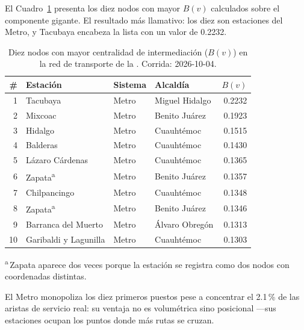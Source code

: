 El Cuadro~\ref{tab:bv-top10} presenta los diez nodos con mayor $B(v)$ calculados
sobre el componente gigante. El resultado más llamativo: los diez son estaciones
del Metro, y Tacubaya encabeza la lista con un valor de 0.2232.

\begin{table}[H]
    \centering
    \caption[Top 10 nodos por centralidad de intermediación $B(v)$]{%
    Diez nodos con mayor centralidad de intermediación ($B(v)$) en la
    red de transporte de la \zmvm{}. Corrida: 2026-10-04.}
    \label{tab:bv-top10}
    \small
    \begin{tabular}{|r|l|l|l|r|}
        \hline
        \textbf{\#} & \textbf{Estación} & \textbf{Sistema} &
        \textbf{Alcaldía} & \textbf{$B(v)$} \\
        \hline
         1 & Tacubaya                  & Metro & Miguel Hidalgo & 0.2232 \\
         2 & Mixcoac                   & Metro & Benito Juárez  & 0.1923 \\
         3 & Hidalgo                   & Metro & Cuauhtémoc     & 0.1515 \\
         4 & Balderas                  & Metro & Cuauhtémoc     & 0.1430 \\
         5 & Lázaro Cárdenas           & Metro & Cuauhtémoc     & 0.1365 \\
         6 & Zapata\textsuperscript{a} & Metro & Benito Juárez  & 0.1357 \\
         7 & Chilpancingo              & Metro & Cuauhtémoc     & 0.1348 \\
         8 & Zapata\textsuperscript{a} & Metro & Benito Juárez  & 0.1346 \\
         9 & Barranca del Muerto       & Metro & Álvaro Obregón & 0.1313 \\
        10 & Garibaldi y Lagunilla     & Metro & Cuauhtémoc     & 0.1303 \\
        \hline
    \end{tabular}
    \vspace{0.4em}

    \noindent\textsuperscript{a}\,Zapata aparece dos veces porque la
    estación se registra como dos nodos con coordenadas distintas.

\end{table}

El Metro monopoliza los diez primeros puestos pese a concentrar el 2.1\,\% de
las aristas de servicio real: su ventaja no es volumétrica sino posicional
---sus estaciones ocupan los puntos donde más rutas se cruzan.

